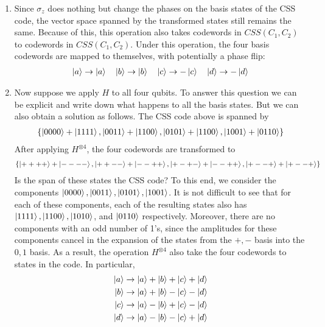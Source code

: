 \documentclass{article}
\theoremstyle{definition}
\begin{document}
\begin{enumerate}[label=(\alph*)]
	
	\item Since $\sigma_z$ does nothing but change the phases on the basis states of the CSS code, the vector space spanned by the transformed states still remains the same. Because of this, this operation also takes codewords in $CSS(C_1, C_2)$ to codewords in $CSS(C_1, C_2)$. Under this operation, the four basis codewords are mapped to themselves, with potentially a phase flip:
	\begin{align*}
		\ket{a} \to \ket{a} \quad \ket{b} \to \ket{b} \quad \ket{c} \to - \ket{c} \quad \ket{d} \to -\ket{d}
	\end{align*}
	
	\item Now suppose we apply $H$ to all four qubits. To answer this question we can be explicit and write down what happens to all the basis states. But we can also obtain a solution as follows. The CSS code above is spanned by 
	\begin{align*}
		\{ \ket{0000} + \ket{1111}, \ket{0011}+\ket{1100} , \ket{0101} + \ket{1100}, \ket{1001} + \ket{0110}   \}
	\end{align*}
	After applying $H^{\otimes 4}$, the four codewords are transformed to
	\begin{align*}
		\{ \ket{++++} + \ket{----}, \ket{++--}+\ket{--++} , \ket{+-+-} + \ket{--++}, \ket{+--+} + \ket{+--+}   \}
	\end{align*}
	Is the span of these states the CSS code? To this end, we consider the components $\ket{0000}, \ket{0011}, \ket{0101}, \ket{1001}$. It is not difficult to see that for each of these components, each of the resulting states also has $\ket{1111}, \ket{1100}, \ket{1010}$, and $\ket{0110}$ respectively. Moreover, there are no components with an odd number of 1's, since the amplitudes for these components cancel in the expansion of the states from the $+,-$ basis into the $0,1$ basis. As a result, the operation $H^{\otimes 4}$ also take the four codewords to states in the code. In particular, 
	\begin{align*}
		\ket{a} \to \ket{a}+\ket{b}+\ket{c}+\ket{d}\\
		\ket{b} \to \ket{a}+\ket{b}-\ket{c}-\ket{d}\\ 
		\ket{c} \to \ket{a}-\ket{b}+\ket{c}-\ket{d}\\
		\ket{d} \to \ket{a}-\ket{b}-\ket{c}+\ket{d}
	\end{align*} 
\end{enumerate}
\end{document}
